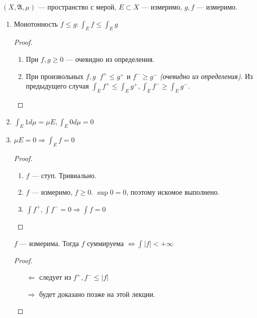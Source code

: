 \begin{prop}\itemfix
    \((X, \mathfrak{A}, \mu)\) --- пространство с мерой, \(E\subset X\) --- измеримо, \(g, f\) --- измеримо.
    \begin{enumerate}
        \item Монотонность \(f \leq g : \int_E f \leq \int_E g\)

              \begin{proof}\itemfix
                  \begin{enumerate}
                      \item При \(f, g \geq 0\) --- очевидно из определения.
                      \item При произвольных \(f, g\ \) \(f^{ +} \leq g^{ +}\) и \(f^{ -} \geq g^{ -}\) \textit{(очевидно из определения)}. Из предыдущего случая \(\int_E f^{ +} \leq \int_E g^{ +}, \int_E f^{ -} \geq \int_E g^{ -}\).
                  \end{enumerate}
              \end{proof}

        \item \(\int_E 1 d\mu = \mu E, \int_E 0 d\mu = 0\)
        \item \(\mu E = 0 \Rightarrow \int_E f = 0\)

              \begin{proof}\itemfix
                  \begin{enumerate}
                      \item \(f\) --- ступ. Тривиально.
                      \item \(f\) --- измеримо, \(f \geq 0\). \(\sup 0 = 0\), поэтому искомое выполнено.
                      \item \(\int f^{ +}, \int f^{ -} = 0 \Rightarrow \int f = 0\)
                  \end{enumerate}
              \end{proof}

              \begin{remark}
                  \(f\) --- измерима. Тогда \(f\) суммируема \(\Leftrightarrow \int |f| < +\infty\)
              \end{remark}
              \begin{proof}\itemfix
                  \begin{itemize}
                      \item [ \( \Leftarrow \)] следует из \(f^{ +}, f^{ -} \leq |f|\)
                      \item [ \( \Rightarrow \)] будет доказано позже на этой лекции. \label{доказано позже}
                  \end{itemize}
              \end{proof}


\end{enumerate}
\end{prop}

